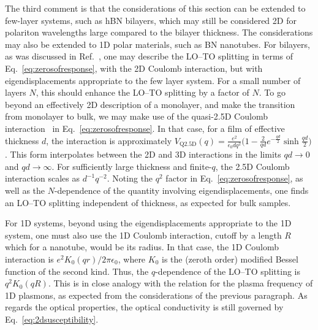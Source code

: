 \documentclass[aps,prb,twocolumn,
	           groupedaddress,superscriptaddress,
               amsfonts,amssymb,amsmath,floatfix,
	           citeautoscript]{revtex4-1}
\begin{document}
The third comment is that the considerations of this section can be extended to few-layer systems, such as hBN bilayers, which may still be considered 2D for polariton wavelengths large compared to the bilayer thickness. The considerations may also be extended to 1D polar materials, such as BN nanotubes. For bilayers, as was discussed in Ref.~, one may describe the LO--TO splitting in terms of Eq.~\eqref{eq:zerosofresponse}, with the 2D Coulomb interaction, but with eigendisplacements appropriate to the few layer system. For a small number of layers $N$, this should enhance the LO--TO splitting by a factor of $N$. 
To go beyond an effectively 2D description of a monolayer, and make the transition from monolayer to bulk, we may make use of the quasi-2.5D Coulomb interaction~\cite{thygesen2017calculating} in Eq.~\eqref{eq:zerosofresponse}. 
In that case, for a film of effective thickness $d$, the interaction is approximately $V_{\text{Q2.5D}}(q) = \frac{e^2}{\epsilon_0 dq^2}\big(1-\frac{2}{qd}e^{-\frac{qd}{2}}\sinh\frac{qd}{2} \big)$. This form interpolates between the 2D and 3D interactions in the limits $qd \rightarrow 0$ and $qd \rightarrow \infty$. For sufficiently large thickness and finite-$q$, the 2.5D Coulomb interaction scales as $d^{-1}q^{-2}$. Noting the $q^2$ factor in Eq.~\eqref{eq:zerosofresponse}, as well as the $N$-dependence of the quantity involving eigendisplacements, one finds an LO--TO splitting independent of thickness, as expected for bulk samples.

For 1D systems, beyond using the eigendisplacements appropriate to the 1D system, one must also use the 1D Coulomb interaction, cutoff by a length $R$ which for a nanotube, would be its radius. In that case, the 1D Coulomb interaction is $e^2K_0(qr)/2\pi\epsilon_0$, where $K_0$ is the (zeroth order) modified Bessel function of the second kind. Thus, the $q$-dependence of the LO--TO splitting is $q^2K_0(qR)$. This is in close analogy with the relation for the plasma frequency of 1D plasmons, as expected from the considerations of the previous paragraph. As regards the optical properties, the optical conductivity is still governed by Eq.~\eqref{eq:2dsusceptibility}.
\end{document}
